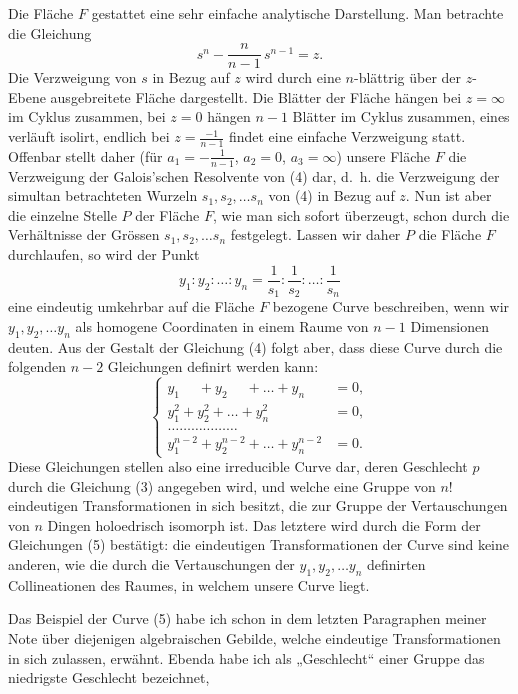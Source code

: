 \documentclass{article}
\begin{document}
Die Fläche $F$ gestattet eine sehr einfache analytische Darstellung. Man betrachte die Gleichung
\[
s^n - \frac{n}{n - 1}\,s^{n-1} = z.
\tag{4}
\]
Die Verzweigung von $s$ in Bezug auf $z$ wird durch eine $n$-blättrig über der $z$-Ebene ausgebreitete Fläche dargestellt. Die Blätter der Fläche hängen bei $z = \infty$ im Cyklus zusammen, bei $z = 0$ hängen $n - 1$ Blätter im Cyklus zusammen, eines verläuft isolirt, endlich bei $z = \frac{-1}{n-1}$ findet eine einfache Verzweigung statt. Offenbar stellt daher (für $a_1 = -\frac{1}{n-1}$, $a_2 = 0$, $a_3 = \infty$) unsere Fläche $F$ die Verzweigung der Galois'schen Resolvente von (4) dar, d.~h. die Verzweigung der simultan betrachteten Wurzeln $s_1, s_2, \dots s_n$ von (4) in Bezug auf $z$. Nun ist aber die einzelne Stelle $P$ der Fläche $F$, wie man sich sofort überzeugt, schon durch die Verhältnisse der Grössen $s_1, s_2, \dots s_n$ festgelegt. Lassen wir daher $P$ die Fläche $F$ durchlaufen, so wird der Punkt
\[
y_1 : y_2 : \dots : y_n = \frac{1}{s_1} : \frac{1}{s_2} : \dots : \frac{1}{s_n}
\]
eine eindeutig umkehrbar auf die Fläche $F$ bezogene Curve beschreiben, wenn wir $y_1, y_2, \dots y_n$ als homogene Coordinaten in einem Raume von $n - 1$ Dimensionen deuten. Aus der Gestalt der Gleichung (4) folgt aber, dass diese Curve durch die folgenden $n - 2$ Gleichungen definirt werden kann:
\[
\left\{
\begin{aligned}
y_1^{\phantom{n-2}} + y_2^{\phantom{n-2}} + \dots + y_n^{\phantom{n-2}} &= 0, \\
y_1^2 + y_2^2 + \dots + y_n^2 &= 0, \\
\dots\dots\dots\dots\dots\dots & \\
y_1^{n-2} + y_2^{n-2} + \dots + y_n^{n-2} &= 0.
\end{aligned}
\right.
\tag{5}
\]
Diese Gleichungen stellen also eine irreducible Curve dar, deren Geschlecht $p$ durch die Gleichung (3) angegeben wird, und welche eine Gruppe von $n!$ eindeutigen Transformationen in sich besitzt, die zur Gruppe der Vertauschungen von $n$ Dingen holoedrisch isomorph ist. Das letztere wird durch die Form der Gleichungen (5) bestätigt: die eindeutigen Transformationen der Curve sind keine anderen, wie die durch die Vertauschungen der $y_1, y_2, \dots y_n$ definirten Collineationen des Raumes, in welchem unsere Curve liegt.

Das Beispiel der Curve (5) habe ich schon in dem letzten Paragraphen meiner Note über diejenigen algebraischen Gebilde, welche eindeutige Transformationen in sich zulassen, erwähnt. Ebenda habe ich als „Geschlecht“ einer Gruppe das niedrigste Geschlecht bezeichnet,
\end{document}
